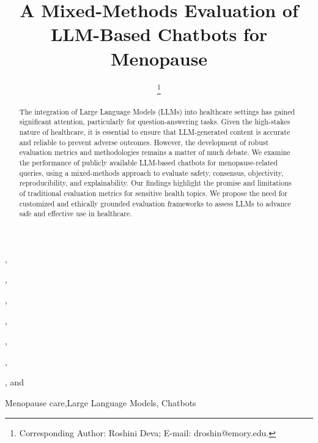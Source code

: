 \documentclass{IOS-Book-Article}
\def\hb{\hbox to 11.5 cm{}}
\begin{document}
\pagestyle{headings}
\def\thepage{}
\begin{frontmatter}              %


\title{A Mixed-Methods Evaluation of LLM-Based Chatbots for Menopause}

\markboth{}{April 2024\hb}

\author[A]{ %
\thanks{Corresponding Author: Roshini Deva; E-mail: droshin@emory.edu.}},
\author[A]{ },
\author[A]{ },
\author[A]{ },
\author[A]{ },
\author[A]{ },
\author[A]{ },
and
\author[A]{ }

\address[A]{Emory University, Atlanta, GA, United States.}


\begin{abstract}
The integration of Large Language Models (LLMs) into healthcare settings has gained significant attention, particularly for question-answering tasks. 
Given the high-stakes nature of healthcare, it is essential to ensure that LLM-generated content is accurate and reliable to prevent adverse outcomes. However, the development of robust evaluation metrics and methodologies remains a matter of much debate. 
We examine the performance of publicly available LLM-based chatbots for menopause-related queries, using a mixed-methods approach to evaluate safety, consensus, objectivity, reproducibility, and explainability. 
Our findings highlight the promise and limitations of traditional evaluation metrics for sensitive health topics. 
We propose the need for customized and ethically grounded evaluation frameworks to assess LLMs to advance safe and effective use in healthcare.
\end{abstract}

\begin{keyword}
Menopause care\sep Large Language Models\sep
Chatbots
\end{keyword}
\end{frontmatter}
\end{document}
